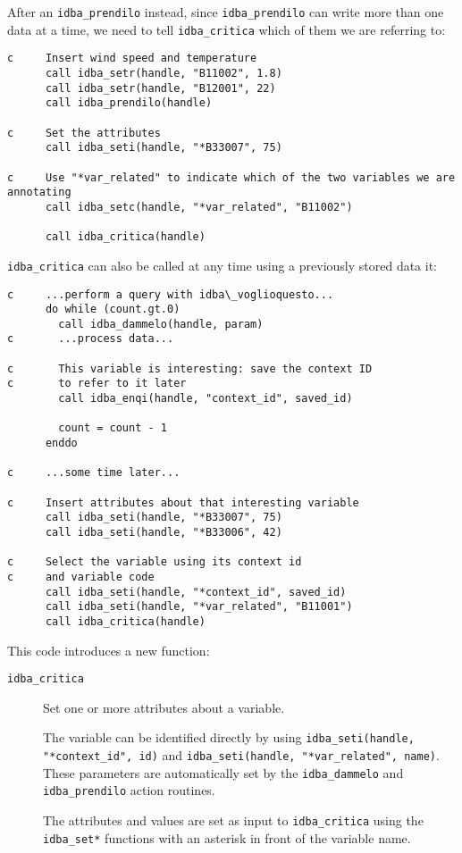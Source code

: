 \documentclass[final,12pt,a4paper,twoside]{book}
\begin{document}
After an {\tt idba\_prendilo} instead, since {\tt idba\_prendilo} can write more than
one data at a time, we need to tell {\tt idba\_critica} which of them we are
referring to:

\begin{verbatim}
c     Insert wind speed and temperature
      call idba_setr(handle, "B11002", 1.8)
      call idba_setr(handle, "B12001", 22)
      call idba_prendilo(handle)

c     Set the attributes
      call idba_seti(handle, "*B33007", 75)

c     Use "*var_related" to indicate which of the two variables we are annotating
      call idba_setc(handle, "*var_related", "B11002")

      call idba_critica(handle)
\end{verbatim}


{\tt idba\_critica} can also be called at any time using a previously stored data it:

\begin{verbatim}
c     ...perform a query with idba\_voglioquesto...
      do while (count.gt.0)
        call idba_dammelo(handle, param)
c       ...process data...

c       This variable is interesting: save the context ID
c       to refer to it later
        call idba_enqi(handle, "context_id", saved_id)
        
        count = count - 1
      enddo

c     ...some time later...

c     Insert attributes about that interesting variable
      call idba_seti(handle, "*B33007", 75)
      call idba_seti(handle, "*B33006", 42)
      
c     Select the variable using its context id
c     and variable code
      call idba_seti(handle, "*context_id", saved_id)
      call idba_seti(handle, "*var_related", "B11001")
      call idba_critica(handle)
\end{verbatim}

This code introduces a new function:

\begin{description}
\item[{\tt idba\_critica}]
  Set one or more attributes about a variable.
  
  The variable can be identified directly by using {\tt idba\_seti(handle,
  "*context\_id", id)} and {\tt idba\_seti(handle, "*var\_related", name)}.
  These parameters are automatically set by the {\tt idba\_dammelo} and {\tt
  idba\_prendilo} action routines.

  The attributes and values are set as input to {\tt idba\_critica} using the
  {\tt idba\_set*} functions with an asterisk in front of the variable name.
\end{description}
\end{document}

